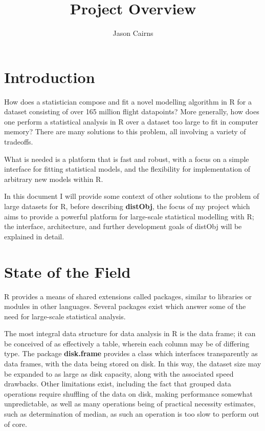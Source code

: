 \documentclass[a4paper,10pt]{article}
\begin{document}
\title{Project Overview}
\author{Jason Cairns}
  
\maketitle{}

\section{Introduction}

How does a statistician compose and fit a novel modelling algorithm in R for a
dataset consisting of over 165 million flight datapoints?
More generally, how does one perform a statistical analysis in R over a dataset
too large to fit in computer memory?
There are many solutions to this problem, all involving a variety of tradeoffs.

What is needed is a platform that is fast and robust, with a focus on a simple
interface for fitting statistical models, and the flexibility for
implementation of arbitrary new models within R.

In this document I will provide some context of other solutions to the problem
of large datasets for R, before describing \textbf{distObj}, the focus of my
project which aims to provide a powerful platform for large-scale statistical
modelling with R; the interface, architecture, and further development goals of
distObj will be explained in detail.

\section{State of the Field}

R provides a means of shared extensions called packages, similar to libraries
or modules in other languages.
Several packages exist which answer some of the need for large-scale
statistical analysis.

The most integral data structure for data analysis in R is the data frame; it
can be conceived of as effectively a table, wherein each column may be of
differing type.
The package \textbf{disk.frame} provides a class which interfaces transparently
as data frames, with the data being stored on disk\cite{zj20}.
In this way, the dataset size may be expanded to as large as disk capacity,
along with the associated speed drawbacks\cite{zj19:_key}.
Other limitations exist, including the fact that grouped data operations
require shuffling of the data on disk, making performance somewhat
unpredictable, as well as many operations being of practical necessity
estimates, such as determination of median, as such an operation is too slow to
perform out of
core\cite{zj19:_group_by}\cite{zj19:_custom_one_stage_group_by_funct}.
\end{document}
